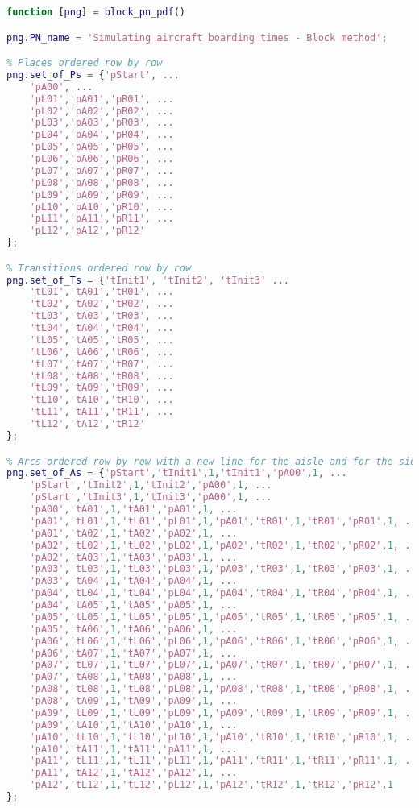 \begin{lstlisting}[language=MATLAB, caption=block\_pn\_pdf.m]
function [png] = block_pn_pdf()

png.PN_name = 'Simulating aircraft boarding times - Block method';

% Places ordered row by row
png.set_of_Ps = {'pStart', ...
    'pA00', ...
    'pL01','pA01','pR01', ...
    'pL02','pA02','pR02', ...
    'pL03','pA03','pR03', ...
    'pL04','pA04','pR04', ...
    'pL05','pA05','pR05', ...
    'pL06','pA06','pR06', ...
    'pL07','pA07','pR07', ...
    'pL08','pA08','pR08', ...
    'pL09','pA09','pR09', ...
    'pL10','pA10','pR10', ...
    'pL11','pA11','pR11', ...
    'pL12','pA12','pR12'
};

% Transitions ordered row by row
png.set_of_Ts = {'tInit1', 'tInit2', 'tInit3' ...
    'tL01','tA01','tR01', ...
    'tL02','tA02','tR02', ...
    'tL03','tA03','tR03', ...
    'tL04','tA04','tR04', ...
    'tL05','tA05','tR05', ...
    'tL06','tA06','tR06', ...
    'tL07','tA07','tR07', ...
    'tL08','tA08','tR08', ...
    'tL09','tA09','tR09', ...
    'tL10','tA10','tR10', ...
    'tL11','tA11','tR11', ...
    'tL12','tA12','tR12'
};

% Arcs ordered row by row with a new line for the aisle and for the sides
png.set_of_As = {'pStart','tInit1',1,'tInit1','pA00',1, ...
    'pStart','tInit2',1,'tInit2','pA00',1, ...
    'pStart','tInit3',1,'tInit3','pA00',1, ...
    'pA00','tA01',1,'tA01','pA01',1, ...
    'pA01','tL01',1,'tL01','pL01',1,'pA01','tR01',1,'tR01','pR01',1, ...
    'pA01','tA02',1,'tA02','pA02',1, ...
    'pA02','tL02',1,'tL02','pL02',1,'pA02','tR02',1,'tR02','pR02',1, ...
    'pA02','tA03',1,'tA03','pA03',1, ...
    'pA03','tL03',1,'tL03','pL03',1,'pA03','tR03',1,'tR03','pR03',1, ...
    'pA03','tA04',1,'tA04','pA04',1, ...
    'pA04','tL04',1,'tL04','pL04',1,'pA04','tR04',1,'tR04','pR04',1, ...
    'pA04','tA05',1,'tA05','pA05',1, ...
    'pA05','tL05',1,'tL05','pL05',1,'pA05','tR05',1,'tR05','pR05',1, ...
    'pA05','tA06',1,'tA06','pA06',1, ...
    'pA06','tL06',1,'tL06','pL06',1,'pA06','tR06',1,'tR06','pR06',1, ...
    'pA06','tA07',1,'tA07','pA07',1, ...
    'pA07','tL07',1,'tL07','pL07',1,'pA07','tR07',1,'tR07','pR07',1, ...
    'pA07','tA08',1,'tA08','pA08',1, ...
    'pA08','tL08',1,'tL08','pL08',1,'pA08','tR08',1,'tR08','pR08',1, ...
    'pA08','tA09',1,'tA09','pA09',1, ...
    'pA09','tL09',1,'tL09','pL09',1,'pA09','tR09',1,'tR09','pR09',1, ...
    'pA09','tA10',1,'tA10','pA10',1, ...
    'pA10','tL10',1,'tL10','pL10',1,'pA10','tR10',1,'tR10','pR10',1, ...
    'pA10','tA11',1,'tA11','pA11',1, ...
    'pA11','tL11',1,'tL11','pL11',1,'pA11','tR11',1,'tR11','pR11',1, ...
    'pA11','tA12',1,'tA12','pA12',1, ...
    'pA12','tL12',1,'tL12','pL12',1,'pA12','tR12',1,'tR12','pR12',1
};
\end{lstlisting}

